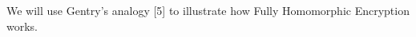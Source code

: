 \documentclass[../../main.tex]{subfiles}
\begin{document}
We will use Gentry's analogy [5] to illustrate how Fully Homomorphic Encryption works. 
\end{document}
